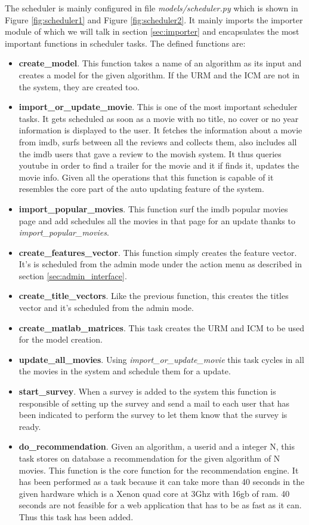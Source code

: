The scheduler is mainly configured in file \textit{models/scheduler.py} which is shown in Figure \ref{fig:scheduler1} and Figure \ref{fig:scheduler2}. It mainly imports the importer module of which we will talk in section \ref{sec:importer} and encapsulates the most important functions in scheduler tasks.
The defined functions are:
\begin{itemize}
\item \textbf{create\_model}. This function takes a name of an algorithm as its input and creates a model for the given algorithm. If the URM and the ICM are not in the system, they are created too.
\item \textbf{import\_or\_update\_movie}. This is one of the most important scheduler tasks. It gets scheduled as soon as a movie with no title, no cover or no year information is displayed to the user. It fetches the information about a movie from imdb, surfs between all the reviews and collects them, also includes all the imdb users that gave a review to the movish system. It thus queries youtube in order to find a trailer for the movie and it if finds it, updates the movie info. Given all the operations that this function is capable of it resembles the core part of the auto updating feature of the system.
\item \textbf{import\_popular\_movies}. This function surf the imdb popular movies page and add schedules all the movies in that page for an update thanks to \textit{import\_popular\_movies}.
\item \textbf{create\_features\_vector}. This function simply creates the feature vector. It's is scheduled from the admin mode under the action menu as described in section \ref{sec:admin_interface}.
\item \textbf{create\_title\_vectors}. Like the previous function, this creates the titles vector and it's scheduled from the admin mode.
\item \textbf{create\_matlab\_matrices}. This task creates the \ac{URM} and \ac{ICM} to be used for the model creation.
\item \textbf{update\_all\_movies}. Using \textit{import\_or\_update\_movie} this task cycles in all the movies in the system and schedule them for a update.
\item \textbf{start\_survey}. When a survey is added to the system this function is responsible of setting up the survey and send a mail to each user that has been indicated to perform the survey to let them know that the survey is ready.
\item \textbf{do\_recommendation}. Given an algorithm, a userid and a integer N, this task stores on database a recommendation for the given algorithm of N movies. This function is the core function for the recommendation engine. It has been performed as a task because it can take more than 40 seconds in the given hardware which is a Xenon quad core at 3Ghz with 16gb of ram. 40 seconds are not feasible for a web application that has to be as fast as it can. Thus this task has been added.
\end{itemize}

